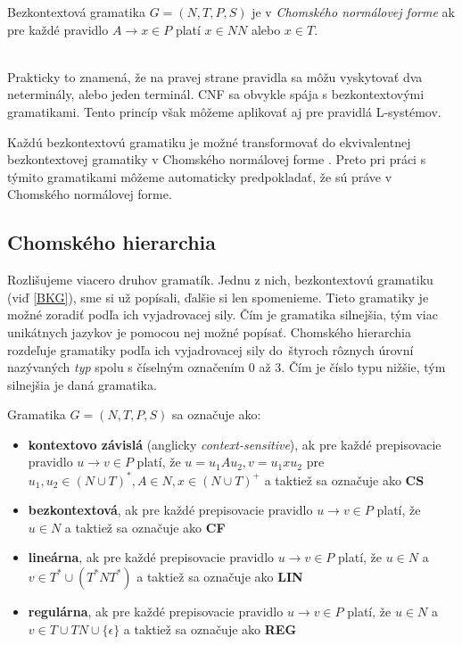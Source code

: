 \begin{definition}
\label{BKG}
Bezkontextová gramatika $ G = (N, T, P, S) $ je v \textit{Chomského normálovej forme} ak pre každé pravidlo $A \to x \in P $  platí $ x \in NN $ alebo $ x \in T $.


\end{definition}
\hfill\\
Prakticky to znamená, že na pravej strane pravidla sa môžu vyskytovať dva neterminály, alebo jeden terminál.
CNF sa obvykle spája s bezkontextovými gramatikami. Tento princíp však môžeme aplikovať aj pre pravidlá L-systémov.

Každú bezkontextovú gramatiku je možné transformovať do ekvivalentnej bezkontextovej gramatiky v Chomského normálovej forme \cite{medunaBase}. Preto pri práci s týmito gramatikami môžeme automaticky predpokladať, že sú práve v Chomského normálovej forme.

\subsection{Chomského hierarchia}
Rozlišujeme viacero druhov gramatík. Jednu z nich, bezkontextovú gramatiku (viď \ref{BKG}), sme si už popísali, ďalšie si len spomenieme. Tieto gramatiky je možné zoradiť podľa ich vyjadrovacej sily. Čím je gramatika silnejšia, tým viac unikátnych jazykov je pomocou nej možné popísať. Chomského hierarchia rozdeľuje gramatiky podľa ich vyjadrovacej sily do~štyroch rôznych úrovní nazývaných \textit{typ} spolu s číselným označením 0 až 3. Čím je číslo typu nižšie, tým silnejšia je daná gramatika.

\begin{definition}
\label{chomskyGrammars}
Gramatika $G = (N, T, P, S)$ sa označuje ako:

\begin{itemize}
    \itemsep0.2em 
    \item[] \textbf{kontextovo závislá} (anglicky \textit{context-sensitive}), ak pre každé prepisovacie pravidlo $u \to v \in P$ platí, že $u = u_1Au_2, v = u_1xu_2$ pre $u_1, u_2 \in (N \cup T)^*, A \in N, x \in (N \cup T)^+$ a taktiež sa označuje ako \textbf{CS}
    \item[] \textbf{bezkontextová}, ak pre každé prepisovacie pravidlo $u \to v \in P$ platí, že $u \in N$ a taktiež sa označuje ako \textbf{CF}
    \item[] \textbf{lineárna}, ak pre každé prepisovacie pravidlo $u \to v \in P$ platí, že $u \in N$ a $v \in T^* \cup (T^*NT^*)$ a taktiež sa označuje ako \textbf{LIN}
    \item[] \textbf{regulárna}, ak pre každé prepisovacie pravidlo $u \to v \in P$ platí, že $u \in N$ a $v \in T \cup TN \cup \{\epsilon\}$ a taktiež sa označuje ako \textbf{REG}
\end{itemize}

\end{definition}
\hfill\\

